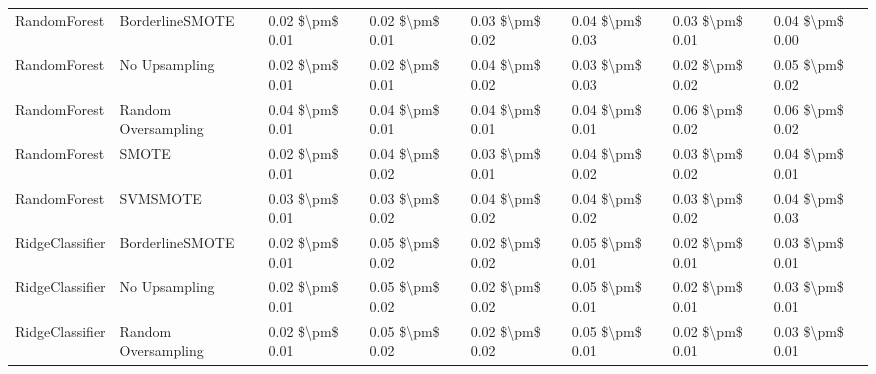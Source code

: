 \begin{tabular}{llllllll}
                   RandomForest &               BorderlineSMOTE & 0.02 \$\textbackslash pm\$ 0.01 &           0.02 \$\textbackslash pm\$ 0.01 &       0.03 \$\textbackslash pm\$ 0.02 &        0.04 \$\textbackslash pm\$ 0.03 &                         0.03 \$\textbackslash pm\$ 0.01 & 0.04 \$\textbackslash pm\$ 0.00 \\
                   RandomForest &                 No Upsampling & 0.02 \$\textbackslash pm\$ 0.01 &           0.02 \$\textbackslash pm\$ 0.01 &       0.04 \$\textbackslash pm\$ 0.02 &        0.03 \$\textbackslash pm\$ 0.03 &                         0.02 \$\textbackslash pm\$ 0.02 & 0.05 \$\textbackslash pm\$ 0.02 \\
                   RandomForest &           Random Oversampling & 0.04 \$\textbackslash pm\$ 0.01 &           0.04 \$\textbackslash pm\$ 0.01 &       0.04 \$\textbackslash pm\$ 0.01 &        0.04 \$\textbackslash pm\$ 0.01 &                         0.06 \$\textbackslash pm\$ 0.02 & 0.06 \$\textbackslash pm\$ 0.02 \\
                   RandomForest &                         SMOTE & 0.02 \$\textbackslash pm\$ 0.01 &           0.04 \$\textbackslash pm\$ 0.02 &       0.03 \$\textbackslash pm\$ 0.01 &        0.04 \$\textbackslash pm\$ 0.02 &                         0.03 \$\textbackslash pm\$ 0.02 & 0.04 \$\textbackslash pm\$ 0.01 \\
                   RandomForest &                      SVMSMOTE & 0.03 \$\textbackslash pm\$ 0.01 &           0.03 \$\textbackslash pm\$ 0.02 &       0.04 \$\textbackslash pm\$ 0.02 &        0.04 \$\textbackslash pm\$ 0.02 &                         0.03 \$\textbackslash pm\$ 0.02 & 0.04 \$\textbackslash pm\$ 0.03 \\
                RidgeClassifier &               BorderlineSMOTE & 0.02 \$\textbackslash pm\$ 0.01 &           0.05 \$\textbackslash pm\$ 0.02 &       0.02 \$\textbackslash pm\$ 0.02 &        0.05 \$\textbackslash pm\$ 0.01 &                         0.02 \$\textbackslash pm\$ 0.01 & 0.03 \$\textbackslash pm\$ 0.01 \\
                RidgeClassifier &                 No Upsampling & 0.02 \$\textbackslash pm\$ 0.01 &           0.05 \$\textbackslash pm\$ 0.02 &       0.02 \$\textbackslash pm\$ 0.02 &        0.05 \$\textbackslash pm\$ 0.01 &                         0.02 \$\textbackslash pm\$ 0.01 & 0.03 \$\textbackslash pm\$ 0.01 \\
                RidgeClassifier &           Random Oversampling & 0.02 \$\textbackslash pm\$ 0.01 &           0.05 \$\textbackslash pm\$ 0.02 &       0.02 \$\textbackslash pm\$ 0.02 &        0.05 \$\textbackslash pm\$ 0.01 &                         0.02 \$\textbackslash pm\$ 0.01 & 0.03 \$\textbackslash pm\$ 0.01 \\

\end{tabular}
